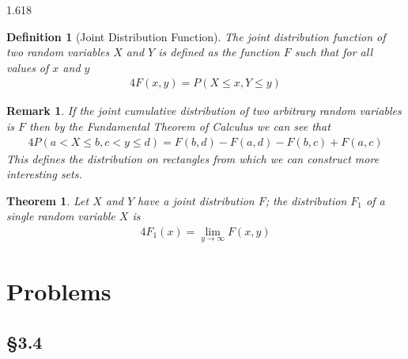 \documentclass[11pt, oneside]{book}   	%
\newtheorem{definition}{Definition}[chapter]
\newtheorem{remark}{Remark}[chapter]
\newtheorem{theorem}{Theorem}[chapter]
\begin{document}
\begin{spacing}{1.618}
		\begin{definition}[Joint Distribution Function]
			The \emph{joint distribution function} of two random variables $X$ and $Y$ is defined as the function $F$ such that for all values of $x$ and $y$
			\begin{alignat}{4}
				F(x, y) = P(X \leq x, Y \leq y)
			\end{alignat}		
		\end{definition}
		
		\begin{remark}
			If the joint cumulative distribution of two arbitrary random variables is $F$ then by the Fundamental Theorem of Calculus we can see that 
			\begin{alignat}{4}
				P(a < X \leq b, c < y \leq d) = F(b, d) - F(a, d) - F(b, c) + F(a, c)
			\end{alignat}
			This defines the distribution on rectangles from which we can construct more interesting sets.  
		\end{remark}

		\begin{theorem}
			Let $X$ and $Y$ have a joint distribution $F$; the distribution $F_1$ of a single random variable $X$ is
			\begin{alignat}{4}
				F_1(x)=\lim_{y\to\infty}F(x, y)
			\end{alignat}
		\end{theorem}

	\section{Problems}
	
		\subsection{\S 3.4}
		

\end{spacing}
\end{document}
